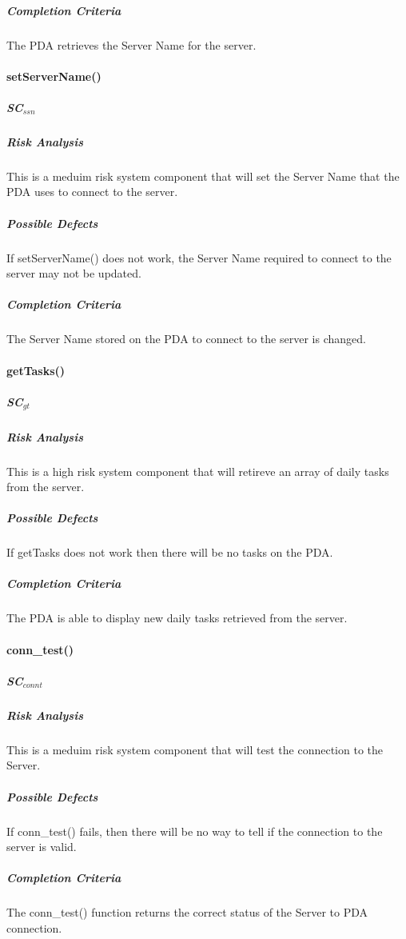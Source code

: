 \documentclass{article}
\begin{document}
\subparagraph{Completion Criteria}
The PDA retrieves the Server Name for the server.

\paragraph{setServerName()}

\subparagraph{SC$_{ssn}$}

\subparagraph{Risk Analysis}
This is a meduim risk system component that will set the Server Name that the PDA uses to connect to the server.

\subparagraph{Possible Defects}
If setServerName() does not work, the Server Name required to connect to the server may not be updated.

\subparagraph{Completion Criteria}
The Server Name stored on the PDA to connect to the server is changed.

\paragraph{getTasks()}

\subparagraph{SC$_{gt}$}

\subparagraph{Risk Analysis}
This is a high risk system component that will retireve an array of daily tasks from the server.

\subparagraph{Possible Defects}
If getTasks does not work then there will be no tasks on the PDA.

\subparagraph{Completion Criteria}
The PDA is able to display new daily tasks retrieved from the server.

\paragraph{conn\_test()}

\subparagraph{SC$_{connt}$}

\subparagraph{Risk Analysis}
This is a meduim risk system component that will test the connection to the Server.

\subparagraph{Possible Defects}
If conn\_test() fails, then there will be no way to tell if the connection to the server is valid.

\subparagraph{Completion Criteria}
The conn\_test() function returns the correct status of the Server to PDA connection.
\end{document}
